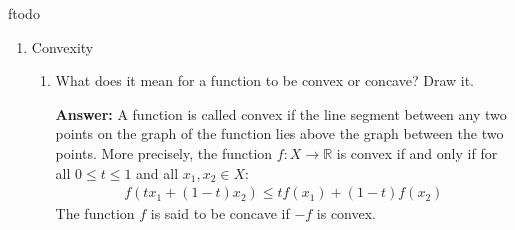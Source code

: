 ƒtodo\documentclass{article}
\newenvironment{QandA}{\begin{enumerate}[label=\arabic*.]}{\end{enumerate}}
\newenvironment{InnerQandA}{\begin{enumerate}[label=\roman*.]}{\end{enumerate}}
\newenvironment{answer}{\par\normalfont \textbf{Answer:}}{}
\newcommand{\R}{\mathbb{R}}
\begin{document}
\begin{QandA}
\begin{InnerQandA}
        \item Give an example of non-differentiable functions that are frequently used in machine learning. How do we do backpropagation if those functions aren’t differentiable?
        \begin{answer}
            Some non-differentiable functions commonly used in Machine Learning: 
            \begin{align*}
                    f(x) &= \vert x \vert \\
                    \text{ReLU}(x) &= \begin{cases}
                    x & \text{if } x \ge 0\\
                    0 & \text{otherwise}
                    \end{cases} \\
                    \text{LeakyReLU}(x) &= \begin{cases}
                    x & \text{if } x \ge 0\\
                    \alpha x & \text{otherwise}
                    \end{cases} \\
            \end{align*}
            Each of these functions are not differentiable at $x=0$. In theory, since any finite set of points is a set of measure $0$, we have $p(x=0)$ and therefore can disregard that these functions are not differentiable. In practice however, due to finite precision it can occur that $x=0$. In these cases we can use a "faux" derivative -- by usually picking the left or the right derivative at the given point.
            
        \end{answer}
        
    \end{InnerQandA}

    \item Convexity
    \begin{InnerQandA}
        \item What does it mean for a function to be convex or concave? Draw it.
        \begin{answer}
            A function is called convex if the line segment between any two points on the graph of the function lies above the graph between the two points. More precisely, the function $f: X \rightarrow \R$ is convex if and only if for all $0 \le t \le 1$ and all $x_1, x_2 \in X$:
            \begin{align*}
                f(t x_1 + (1-t)x_2) \le t f(x_1) + (1-t)f(x_2)
            \end{align*}
        \end{answer}
        The function $f$ is said to be concave if $-f$ is convex.


\end{InnerQandA}
\end{QandA}
\end{document}

